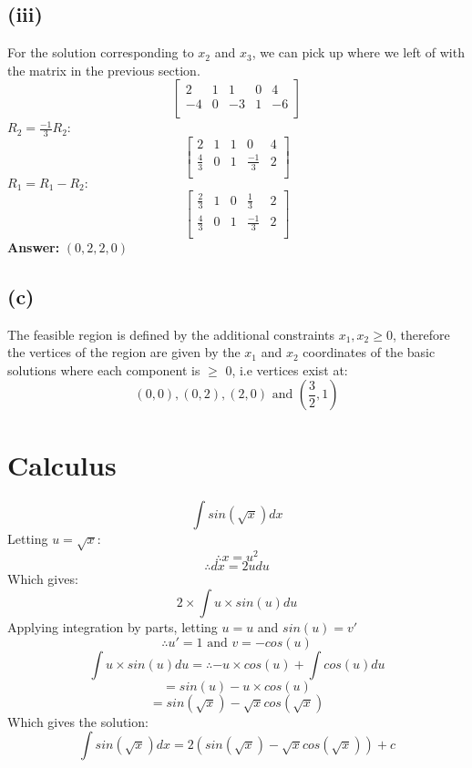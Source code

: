 \documentclass[11pt]{article}
\begin{document}
\subsection*{(iii)}
For the solution corresponding to $x_2$ and $x_3$, we can pick up where we left of with the matrix in the previous section.
$$\begin{bmatrix}
2 & 1 & 1 & 0 & 4\\
-4 & 0 & -3 & 1 & -6\\
\end{bmatrix}$$
$R_2=\frac{-1}{3}R_2$:
$$\begin{bmatrix}
2 & 1 & 1 & 0 & 4\\
\frac{4}{3} & 0 & 1 & \frac{-1}{3} & 2\\
\end{bmatrix}$$
$R_1=R_1-R_2:$
$$\begin{bmatrix}
\frac{2}{3} & 1 & 0 & \frac{1}{3} & 2\\
\frac{4}{3} & 0 & 1 & \frac{-1}{3} & 2\\
\end{bmatrix}$$
\textbf{Answer:} $(0,2,2,0)$
\subsection*{(c)}
The feasible region is defined by the additional constraints $x_1,x_2 \geq 0$, therefore the vertices of the region are given by the $x_1$ and $x_2$ coordinates of the basic solutions where each component is $\geq$ 0, i.e vertices exist at:
$$(0,0),(0,2),(2,0)\text{ and }(\frac{3}{2}, 1)$$
\section*{Calculus}
$$\int sin(\sqrt{x}) dx $$
Letting $u=\sqrt{x}$:
$$\therefore x = u^2$$
$$\therefore dx = 2udu$$
Which gives:
$$2 \times \int u\times sin(u) du $$
Applying integration by parts, letting $u=u$ and $sin(u)=v'$
$$\therefore u'=1 \text{ and } v=-cos(u)$$
$$\int u\times sin(u) du =\therefore -u\times cos(u)+\int cos(u)du$$
$$ = sin(u)-u\times cos(u)$$
$$ = sin(\sqrt{x})- \sqrt{x}cos(\sqrt{x})$$
Which gives the solution:
$$\int sin(\sqrt{x}) dx =2( sin(\sqrt{x})- \sqrt{x}cos(\sqrt{x}))+c$$
\end{document}

